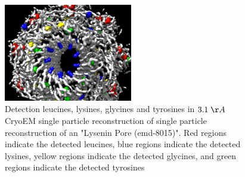 \begin{figure}[!ht]
  \caption{Detection leucines, lysines, glycines and tyrosines  in  $3.1 \; \AA$ CryoEM single particle reconstruction of single particle reconstruction of an "Lysenin Pore (emd-8015)". Red regions indicate the detected {\color{red} leucines}, blue regions indicate the detected {\color{blue} lysines}, yellow regions indicate the detected {\color{yellow} glycines}, and green regions indicate the detected {\color{green} tyrosines} } \label{f:LYS31}
  \centering
    \includegraphics[width=0.5\textwidth]{pics/lys_pore_GLY_LEU_LYS_TYR.png}
\end{figure}






